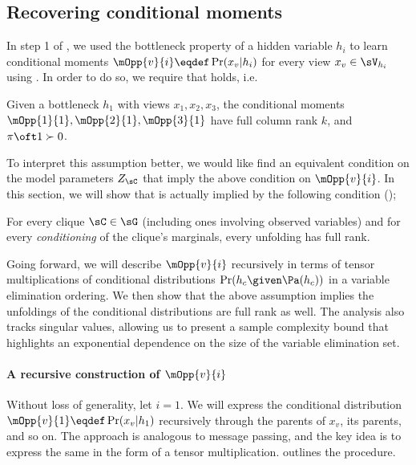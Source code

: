 \subsection{Recovering conditional moments}
\label{app:assumption-proof}

In step 1 of \LearnMarginals, we used the bottleneck property of a hidden
  variable $h_i$ to learn conditional moments $\mOpp{v}{i} \eqdef
  \Pr(x_v | h_i)$ for every view $x_v \in \sV_{h_i}$ using
  \TensorFactorize. 
In order to do so, we require that  holds, i.e.
\begin{assumption*}
  Given a bottleneck $h_1$ with views $x_1, x_2, x_3$, the conditional
  moments $\mOpp{1}{1}, \mOpp{2}{1}, \mOpp{3}{1}$ have full column rank
  $k$, and $\pi\oft 1 \succ 0$.
\end{assumption*}

To interpret this assumption better, we would like find an equivalent
condition on the model parameters $Z_\sC$ that imply the above condition
on $\mOpp{v}{i}$. In this section, we will show that
 is actually implied by the following condition
();
\begin{assumption*}
For every clique $\sC \in \sG$ (including ones involving observed
  variables) and for every {\em conditioning} of the clique's marginals,
  every unfolding has full rank. 
\end{assumption*}

Going forward, we will describe $\mOpp{v}{i}$ recursively in terms of
  tensor multiplications of conditional distributions $\Pr(h_c \given
  \Pa(h_c))$ in a variable elimination ordering.
We then show that the above assumption implies the unfoldings of the
  conditional distributions are full rank as well.
The analysis also tracks singular values, allowing us to present
  a sample complexity bound that highlights an exponential dependence on
  the size of the variable elimination set.  

\paragraph{A recursive construction of $\mOpp{v}{i}$}

Without loss of generality, let $i = 1$. We will express the conditional
distribution $\mOpp{v}{1} \eqdef \Pr(x_v | h_1)$ recursively through the
parents of $x_v$, its parents, and so on. The approach is analogous to
message passing, and the key idea is to express the same in the form of
a tensor multiplication.  outlines the
procedure.

